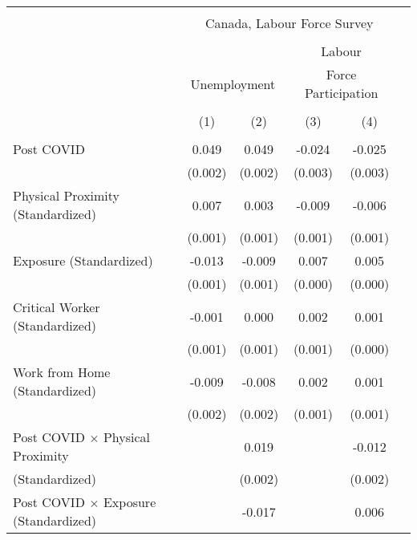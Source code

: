 \begin{tabular*}{\textwidth}{ @{\extracolsep{\fill}}l*{5}{c}}
\hline\hline
\\
 &\multicolumn{4}{c}{Canada, Labour Force Survey} \\
\cline{2-5} \\
&\multicolumn{2}{c}{} &\multicolumn{2}{c}{Labour} \\
&\multicolumn{2}{c}{Unemployment} &\multicolumn{2}{c}{Force Participation} \\
\cline{2-3} \cline{4-5} \\
                                                       &\multicolumn{1}{c}{(1)}     &\multicolumn{1}{c}{(2)}     &\multicolumn{1}{c}{(3)}     &\multicolumn{1}{c}{(4)}\\
\hline
\\
Post COVID                                             &0.049     &0.049     &-0.024     &-0.025\\
                                                       &(0.002)     &(0.002)     &(0.003)     &(0.003)\\[0.5em]
%
Physical Proximity (Standardized)                      &0.007     &0.003     &-0.009     &-0.006\\
                                                       &(0.001)     &(0.001)     &(0.001)     &(0.001)\\[0.5em]
%
Exposure (Standardized)                                &-0.013     &-0.009     &0.007     &0.005\\
                                                       &(0.001)     &(0.001)     &(0.000)     &(0.000)\\[0.5em]
%
Critical Worker (Standardized)                         &-0.001     &0.000     &0.002     &0.001\\
                                                       &(0.001)     &(0.001)     &(0.001)     &(0.000)\\[0.5em]
%
Work from Home (Standardized)                          &-0.009     &-0.008     &0.002     &0.001\\
                                                       &(0.002)     &(0.002)     &(0.001)     &(0.001)\\[0.5em]
%
Post COVID $\times$ Physical Proximity                 &         &0.019     &         &-0.012\\
(Standardized)                                         &         &(0.002)     &         &(0.002)\\[0.5em]
%
Post COVID $\times$ Exposure (Standardized)            &         &-0.017     &         &0.006\\

\end{tabular*}
